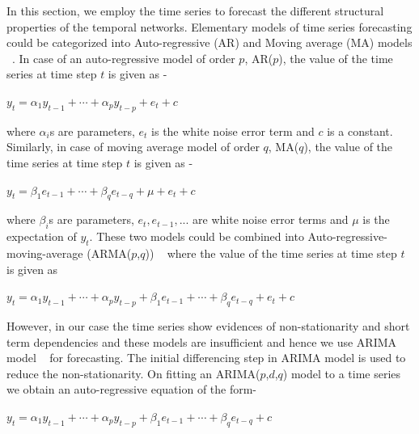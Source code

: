 In this section, we employ the time series to forecast the different structural properties of the temporal networks.
Elementary models of time series forecasting could be categorized into Auto-regressive (AR) and Moving average (MA) models ~\cite{chatfield2013analysis}. In case of 
an auto-regressive model of order $p$, AR($p$), the value of the time series at time step $t$ is given as - 
\begin{center}
 $y_{t}=\alpha_{1}y_{t-1}+\cdots+\alpha_{p}y_{t-p}+e_t+c$
\end{center}
where $\alpha_{i}$s are parameters, $e_t$ is the white noise error term and $c$ is a constant.
Similarly, in case of moving average model of order $q$, MA($q$), the value of the time series at time step $t$ is given as - 
\begin{center}
 $y_{t}=\beta_{1}e_{t-1}+\cdots+\beta_{q}e_{t-q}+\mu+e_t+c$
\end{center}
where $\beta_{i}$s are parameters, $e_t,e_{t-1},...$ are white noise error terms and $\mu$ is the expectation of $y_t$.
These two models could be combined into Auto-regressive-moving-average (ARMA($p$,$q$)) ~\cite{chatfield2013analysis} where the value of the time series at time step $t$ is given as
\begin{center}
 $y_{t}=\alpha_{1}y_{t-1}+\cdots+\alpha_{p}y_{t-p}+\beta_{1}e_{t-1}+\cdots+\beta_{q}e_{t-q}+e_t+c$
\end{center}

However, in our case the time series show evidences of non-stationarity and short term dependencies and these models are insufficient and hence we use ARIMA model ~\cite{box2011time} for forecasting. The initial differencing step in ARIMA model 
is used to reduce the non-stationarity.
On fitting an ARIMA($p$,$d$,$q$) model to a time series we obtain an auto-regressive 
equation of the form-

\begin{center}
 $y_{t}=\alpha_{1}y_{t-1}+\cdots+\alpha_{p}y_{t-p}+\beta_{1}e_{t-1}+\cdots+\beta_{q}e_{t-q}+c$
\end{center}

